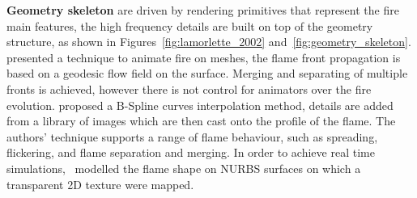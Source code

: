 \textbf{Geometry skeleton} are driven by rendering primitives that represent the fire main features, the high frequency details are built on top of the geometry structure, as shown in Figures~\ref{fig:lamorlette_2002} and~\ref{fig:geometry_skeleton}.
\cite{Lee:2001} presented a technique to animate fire on meshes, the flame front propagation is based on a geodesic flow field on the surface.
Merging and separating of multiple fronts is achieved, however there is not control for animators over the fire evolution. 
\cite{Lamorlette:2002} proposed a B-Spline curves interpolation method, details are added from a library of images which are then cast onto the profile of the flame.
The authors' technique supports a range of flame behaviour, such as spreading, flickering, and flame separation and merging.
In order to achieve real time simulations,~\cite{Bridault:2006} modelled the flame shape on NURBS surfaces on which a transparent 2D texture were mapped.

